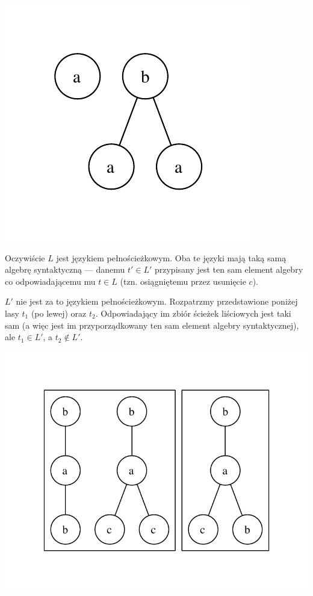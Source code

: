 \begin{przyklad}
\begin{center}
\begin{minipage}[t]{.25\linewidth}
			\includegraphics[scale=0.6]{rysunki/w12-usuniecie_c_2.pdf}
		\end{minipage}
	\end{center}
	
	Oczywiście $L$ jest językiem pełnościeżkowym. Oba te języki mają taką samą algebrę syntaktyczną --- danemu $t' \in L'$ przypisany jest ten sam element algebry co odpowiadającemu mu $t \in L$ (tzn. osiągniętemu przez usunięcie $c$).
	
	$L'$ nie jest za to językiem pełnościeżkowym. Rozpatrzmy przedstawione poniżej lasy $t_1$ (po lewej) oraz $t_2$. Odpowiadający im zbiór ścieżek liściowych jest taki sam (a więc jest im przyporządkowany ten sam element algebry syntaktycznej), ale $t_1 \in L'$, a $t_2 \notin L'$.
	
	\begin{center}
		\includegraphics[scale=0.6]{rysunki/w12-l_prim.pdf}
	\end{center}
	
\end{przyklad}